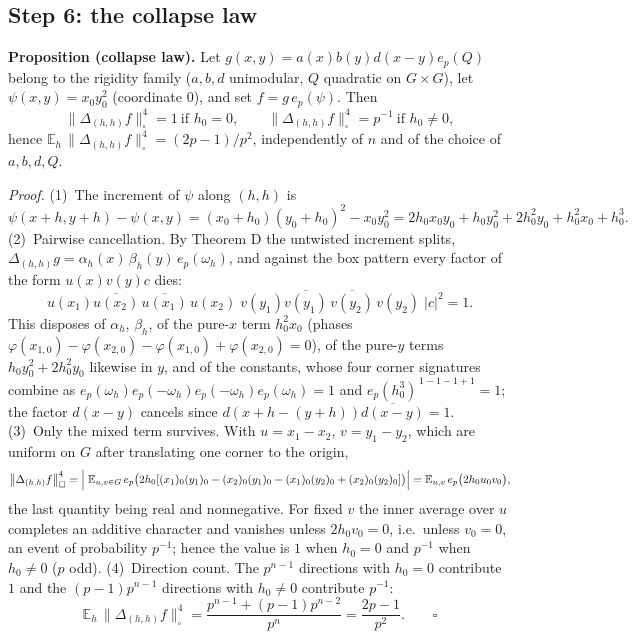 \documentclass[11pt]{article}
\begin{document}
\subsection{Step 6: the collapse law}
\textbf{Proposition (collapse law).} Let $g(x,y)=a(x)b(y)d(x-y)e_p(Q)$ belong
to the rigidity family ($a,b,d$ unimodular, $Q$ quadratic on $G\times G$), let
$\psi(x,y)=x_0y_0^{2}$ (coordinate $0$), and set $f=g\,e_p(\psi)$. Then
\[
\bigl\|\Delta_{(h,h)}f\bigr\|_\square^4=1\ \text{if }h_0=0,
\qquad
\bigl\|\Delta_{(h,h)}f\bigr\|_\square^4=p^{-1}\ \text{if }h_0\neq0,
\]
hence $\mathbb{E}_h\,\bigl\|\Delta_{(h,h)}f\bigr\|_\square^4=(2p-1)/p^{2}$,
independently of $n$ and of the choice of $a,b,d,Q$.

\emph{Proof.} (1)~The increment of $\psi$ along $(h,h)$ is
\[
\psi(x+h,y+h)-\psi(x,y)=(x_0+h_0)(y_0+h_0)^{2}-x_0y_0^{2}
=2h_0x_0y_0+h_0y_0^{2}+2h_0^{2}y_0+h_0^{2}x_0+h_0^{3}.
\]
(2)~Pairwise cancellation. By Theorem D the untwisted increment splits,
$\Delta_{(h,h)}g=\alpha_h(x)\,\beta_h(y)\,e_p(\omega_h)$, and against the box
pattern every factor of the form $u(x)v(y)c$ dies:
\[
u(x_1)\overline{u(x_2)}\,\overline{u(x_1)}\,u(x_2)\;
v(y_1)\overline{v(y_1)}\,\overline{v(y_2)}\,v(y_2)\;|c|^{2}=1 .
\]
This disposes of $\alpha_h$, $\beta_h$, of the pure-$x$ term $h_0^{2}x_0$
(phases $\varphi(x_{1,0})-\varphi(x_{2,0})-\varphi(x_{1,0})+\varphi(x_{2,0})
=0$), of the pure-$y$ terms $h_0y_0^{2}+2h_0^{2}y_0$ likewise in $y$, and of
the constants, whose four corner signatures combine as
$e_p(\omega_h)e_p(-\omega_h)e_p(-\omega_h)e_p(\omega_h)=1$ and
$e_p(h_0^{3})^{\,1-1-1+1}=1$; the factor $d(x-y)$ cancels since
$d(x+h-(y+h))\overline{d(x-y)}=1$. (3)~Only the mixed term survives. With
$u=x_1-x_2$, $v=y_1-y_2$, which are uniform on $G$ after translating one
corner to the origin,
\[
\bigl\|\Delta_{(h,h)}f\bigr\|_\square^4
=\Bigl|\;\mathbb{E}_{u,v\in G}\,
e_p\bigl(2h_0[(x_{1})_0(y_{1})_0-(x_{2})_0(y_{1})_0
-(x_{1})_0(y_{2})_0+(x_{2})_0(y_{2})_0]\bigr)\Bigr|
=\mathbb{E}_{u,v}\,e_p\bigl(2h_0u_0v_0\bigr),
\]
the last quantity being real and nonnegative. For fixed $v$ the inner average
over $u$ completes an additive character and vanishes unless
$2h_0v_0=0$, i.e.\ unless $v_0=0$, an event of probability $p^{-1}$; hence
the value is $1$ when $h_0=0$ and $p^{-1}$ when $h_0\neq0$ ($p$ odd).
(4)~Direction count. The $p^{n-1}$ directions with $h_0=0$ contribute $1$ and
the $(p-1)p^{n-1}$ directions with $h_0\neq0$ contribute $p^{-1}$:
\[
\mathbb{E}_h\,\bigl\|\Delta_{(h,h)}f\bigr\|_\square^4
=\frac{p^{n-1}+(p-1)p^{n-2}}{p^{n}}
=\frac{2p-1}{p^{2}} . \qquad\square
\]
\end{document}
